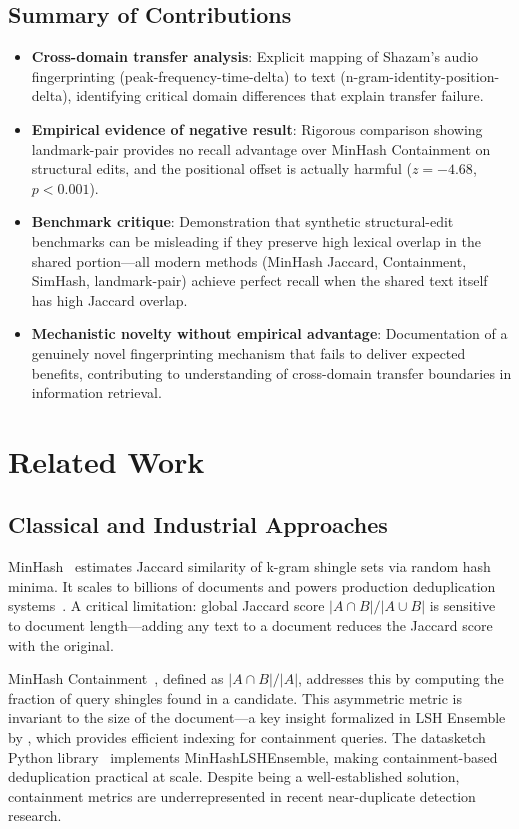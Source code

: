 \documentclass[11pt,letterpaper]{article}
\begin{document}
\subsection*{Summary of Contributions}

\begin{itemize}
  \item \textbf{Cross-domain transfer analysis}: Explicit mapping of Shazam's audio fingerprinting (peak-frequency-time-delta) to text (n-gram-identity-position-delta), identifying critical domain differences that explain transfer failure.
  \item \textbf{Empirical evidence of negative result}: Rigorous comparison showing landmark-pair provides no recall advantage over MinHash Containment on structural edits, and the positional offset is actually harmful ($z=-4.68$, $p<0.001$).
  \item \textbf{Benchmark critique}: Demonstration that synthetic structural-edit benchmarks can be misleading if they preserve high lexical overlap in the shared portion---all modern methods (MinHash Jaccard, Containment, SimHash, landmark-pair) achieve perfect recall when the shared text itself has high Jaccard overlap.
  \item \textbf{Mechanistic novelty without empirical advantage}: Documentation of a genuinely novel fingerprinting mechanism that fails to deliver expected benefits, contributing to understanding of cross-domain transfer boundaries in information retrieval.
\end{itemize}

\section{Related Work}

\subsection{Classical and Industrial Approaches}

MinHash~\citep{Broder1997} estimates Jaccard similarity of k-gram shingle sets via random hash minima. It scales to billions of documents and powers production deduplication systems~\citep{Lee2022, Gao2020, Penedo2023}. A critical limitation: global Jaccard score $|A \cap B|/|A \cup B|$ is sensitive to document length---adding any text to a document reduces the Jaccard score with the original.

MinHash Containment~\citep{Broder1997}, defined as $|A \cap B|/|A|$, addresses this by computing the fraction of query shingles found in a candidate. This asymmetric metric is invariant to the size of the document---a key insight formalized in LSH Ensemble by \citet{Zhu2016}, which provides efficient indexing for containment queries. The datasketch Python library~\citep{datasketch} implements MinHashLSHEnsemble, making containment-based deduplication practical at scale. Despite being a well-established solution, containment metrics are underrepresented in recent near-duplicate detection research.
\end{document}
